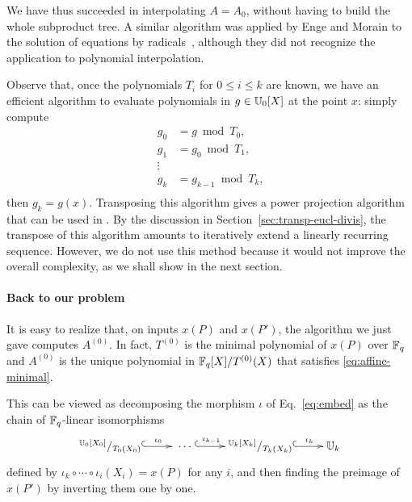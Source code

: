  We have thus succeeded in interpolating $A=A_0$,
without having to build the whole subproduct tree. A similar algorithm
was applied by Enge and Morain to the solution of equations by
radicals~\cite{enge+morain03}, although they did not recognize the
application to polynomial interpolation.

\begin{remark}
  Observe that, once the polynomials $T_i$ for $0\le i\le k$ are
  known, we have an efficient algorithm to evaluate polynomials in
  $g\in\mathbb{U}_0[X]$ at the point $x$: simply compute
  \begin{equation}
    \label{eq:191}
    \begin{aligned}
      g_0 &= g\bmod T_0\text{,}\\
      g_1 &= g_0\bmod T_1\text{,}\\
      \vdots\\
      g_k &= g_{k-1}\bmod T_k\text{,}\\
    \end{aligned}
  \end{equation}
  then $g_k=g(x)$. Transposing this algorithm gives a power projection
  algorithm that can be used in \hyperref[alg:rur]{}. By the discussion in
  Section~\ref{sec:transp-eucl-divis}, the
  transpose of this algorithm
  amounts to iteratively extend a linearly recurring
  sequence. However, we do not use this method because it would not
  improve the overall complexity, as we shall show in the next
  section.
\end{remark}


\paragraph{Back to our problem}
It is easy to realize that, on inputs $x(P)$ and $x(P')$, the
algorithm we just gave computes $A^{(0)}$. In fact, $T^{(0)}$ is
the minimal polynomial of $x(P)$ over $\mathbb{F}_q$ and $A^{(0)}$ is the
unique polynomial in $\mathbb{F}_q[X]/T^{(0)}(X)$ that satisfies
\eqref{eq:affine-minimal}.

This can be viewed as decomposing the morphism $\iota$ of
Eq.~\eqref{eq:embed} as the chain of $\mathbb{F}_q$-linear isomorphisms
\begin{equation}
  \xymatrix{
    ^{\U_0[X_0]}/_{T_0(X_0)} \ar@{^{(}->}[r]^-{\iota_0} &
    \;\cdots\; \ar@{^{(}->}[r]^-{\iota_{k-1}} &
    ^{\U_k[X_k]}/_{T_k(X_k)} \ar@{^{(}->}[r]^-{\iota_k} &
    \U_k
  }
\end{equation}
defined by $\iota_k\circ\cdots\circ\iota_i(X_i) = x(P)$ for any $i$,
and then finding the preimage of $x(P')$ by inverting them one by
one.

